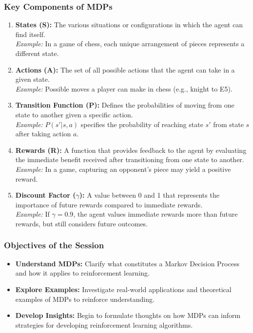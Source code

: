 \documentclass{beamer}
\begin{document}
\begin{frame}[fragile]
    \frametitle{Key Components of MDPs}
    \begin{enumerate}
        \item \textbf{States (S):} The various situations or configurations in which the agent can find itself. \\
        \textit{Example:} In a game of chess, each unique arrangement of pieces represents a different state.
        
        \item \textbf{Actions (A):} The set of all possible actions that the agent can take in a given state. \\
        \textit{Example:} Possible moves a player can make in chess (e.g., knight to E5).
        
        \item \textbf{Transition Function (P):} Defines the probabilities of moving from one state to another given a specific action. \\
        \textit{Example:} \( P(s' | s, a) \) specifies the probability of reaching state \( s' \) from state \( s \) after taking action \( a \).
        
        \item \textbf{Rewards (R):} A function that provides feedback to the agent by evaluating the immediate benefit received after transitioning from one state to another. \\
        \textit{Example:} In a game, capturing an opponent’s piece may yield a positive reward.
        
        \item \textbf{Discount Factor ($\gamma$):} A value between 0 and 1 that represents the importance of future rewards compared to immediate rewards. \\
        \textit{Example:} If $\gamma = 0.9$, the agent values immediate rewards more than future rewards, but still considers future outcomes.
    \end{enumerate}
\end{frame}

\begin{frame}[fragile]
    \frametitle{Objectives of the Session}
    \begin{itemize}
        \item \textbf{Understand MDPs:} Clarify what constitutes a Markov Decision Process and how it applies to reinforcement learning.
        \item \textbf{Explore Examples:} Investigate real-world applications and theoretical examples of MDPs to reinforce understanding.
        \item \textbf{Develop Insights:} Begin to formulate thoughts on how MDPs can inform strategies for developing reinforcement learning algorithms.
    \end{itemize}
\end{frame}
\end{document}
